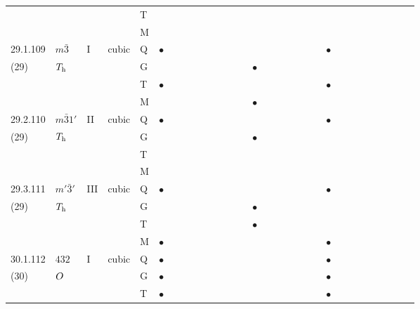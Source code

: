\documentclass[fleqn,9pt,landscape]{jsarticle}
\begin{document}
\begin{longtable}{lllll|l|lll|ll|lll|l|lll|lll|l|ll|lll|lll}
 &  &  &  & T &  &  &  &  &  &  &  &  &  &  &  &  &  &  &  &  &  &  &  &  &  &  &  &  &  \\
 &  &  &  & M &  &  &  &  &  &  &  &  &  &  &  &  &  &  &  &  &  &  &  &  &  &  &  &  &  \\ \hline
29.1.109 & \texttt{$m\bar{3}$} & I & cubic & Q & $\bullet$ &  &  &  &  &  &  &  &  &  &  &  &  &  &  &  & $\bullet$ &  &  &  &  &  &  &  &  \\
(29) & $T_{\rm h}$ &  &  & G &  &  &  &  &  &  &  &  &  & $\bullet$ &  &  &  &  &  &  &  &  &  &  &  &  &  &  &  \\
 &  &  &  & T & $\bullet$ &  &  &  &  &  &  &  &  &  &  &  &  &  &  &  & $\bullet$ &  &  &  &  &  &  &  &  \\
 &  &  &  & M &  &  &  &  &  &  &  &  &  & $\bullet$ &  &  &  &  &  &  &  &  &  &  &  &  &  &  &  \\ \hline
29.2.110 & \texttt{$m\bar{3}1'$} & II & cubic & Q & $\bullet$ &  &  &  &  &  &  &  &  &  &  &  &  &  &  &  & $\bullet$ &  &  &  &  &  &  &  &  \\
(29) & $T_{\rm h}$ &  &  & G &  &  &  &  &  &  &  &  &  & $\bullet$ &  &  &  &  &  &  &  &  &  &  &  &  &  &  &  \\
 &  &  &  & T &  &  &  &  &  &  &  &  &  &  &  &  &  &  &  &  &  &  &  &  &  &  &  &  &  \\
 &  &  &  & M &  &  &  &  &  &  &  &  &  &  &  &  &  &  &  &  &  &  &  &  &  &  &  &  &  \\ \hline
29.3.111 & \texttt{$m'\bar{3}'$} & III & cubic & Q & $\bullet$ &  &  &  &  &  &  &  &  &  &  &  &  &  &  &  & $\bullet$ &  &  &  &  &  &  &  &  \\
(29) & $T_{\rm h}$ &  &  & G &  &  &  &  &  &  &  &  &  & $\bullet$ &  &  &  &  &  &  &  &  &  &  &  &  &  &  &  \\
 &  &  &  & T &  &  &  &  &  &  &  &  &  & $\bullet$ &  &  &  &  &  &  &  &  &  &  &  &  &  &  &  \\
 &  &  &  & M & $\bullet$ &  &  &  &  &  &  &  &  &  &  &  &  &  &  &  & $\bullet$ &  &  &  &  &  &  &  &  \\ \hline
30.1.112 & \texttt{$432$} & I & cubic & Q & $\bullet$ &  &  &  &  &  &  &  &  &  &  &  &  &  &  &  & $\bullet$ &  &  &  &  &  &  &  &  \\
(30) & $O_{\rm }$ &  &  & G & $\bullet$ &  &  &  &  &  &  &  &  &  &  &  &  &  &  &  & $\bullet$ &  &  &  &  &  &  &  &  \\
 &  &  &  & T & $\bullet$ &  &  &  &  &  &  &  &  &  &  &  &  &  &  &  & $\bullet$ &  &  &  &  &  &  &  &  \\

\end{longtable}
\end{document}
